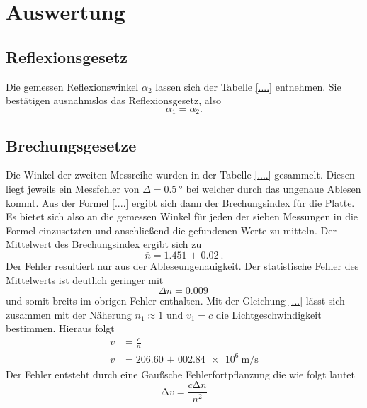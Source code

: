 \section{Auswertung}

\subsection{Reflexionsgesetz}
Die gemessen Reflexionswinkel $\alpha_2$ lassen sich der Tabelle \ref{....} entnehmen. Sie bestätigen ausnahmslos
das Reflexionsgesetz, also %
\begin{equation*}
    \alpha_1=\alpha_2.
\end{equation*}


\subsection{Brechungsgesetze}
\label{brechung}
Die Winkel der zweiten Messreihe wurden in der Tabelle \ref{....} gesammelt. Diesen liegt jeweils ein Messfehler von
$\Delta = \SI{0.5}{\degree}$ bei welcher durch das ungenaue Ablesen kommt. Aus der Formel \eqref{....} ergibt sich dann 
der Brechungsindex für die Platte. Es bietet sich also an die gemessen Winkel für jeden der sieben Messungen in die Formel einzusetzten 
und anschließend die gefundenen Werte zu mitteln. Der Mittelwert des Brechungsindex ergibt sich zu
\begin{equation}
    \label{eqn:n}
    \bar{n} = \SI{1.451(0020)}{}.
\end{equation}
Der Fehler resultiert nur aus der Ableseungenauigkeit. Der statistische Fehler des Mittelwerts ist deutlich geringer mit
\begin{equation*}
    \Delta n = \SI{0.009}{}
\end{equation*}
und somit breits im obrigen Fehler enthalten. Mit der Gleichung \eqref{...} lässt sich zusammen mit der Näherung $n_1 \approx 1$
und $v_1 = c$ \cite{...} die Lichtgeschwindigkeit bestimmen. Hieraus folgt
\begin{align*}
    v &= \frac{c}{n} \\
    v &= \SI{206.60(00284)e6}{\meter\per\second}
\end{align*}
Der Fehler entsteht durch eine Gaußsche Fehlerfortpflanzung die wie folgt lautet
\begin{equation}
    \increment v = \frac{c \increment n}{n^2}
\end{equation}


